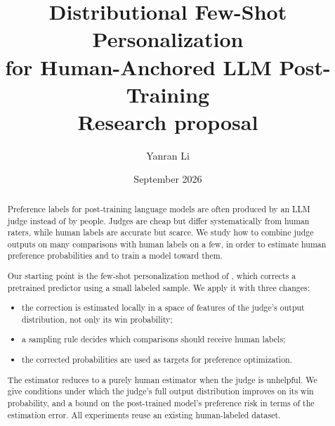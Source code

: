 \documentclass[11pt]{article}
\title{Distributional Few-Shot Personalization\\for Human-Anchored LLM Post-Training\\[6pt]
\large Research proposal}
\author{Yanran Li}
\date{September 2026}
\theoremstyle{plain}
\begin{document}
\maketitle

\begin{abstract}
Preference labels for post-training language models are often produced by an LLM judge instead of
by people. Judges are cheap but differ systematically from human raters, while human labels are
accurate but scarce. We study how to combine judge outputs on many comparisons with human labels on
a few, in order to estimate human preference probabilities and to train a model toward them.

Our starting point is the few-shot personalization method of \citet{li2026personalizing}, which
corrects a pretrained predictor using a small labeled sample. We apply it with three changes:
\begin{itemize}
  \item the correction is estimated locally in a space of features of the judge's output
        distribution, not only its win probability;
  \item a sampling rule decides which comparisons should receive human labels;
  \item the corrected probabilities are used as targets for preference optimization.
\end{itemize}
The estimator reduces to a purely human estimator when the judge is unhelpful. We give conditions
under which the judge's full output distribution improves on its win probability, and a bound on
the post-trained model's preference risk in terms of the estimation error. All experiments reuse an
existing human-labeled dataset.
\end{abstract}









\end{document}
